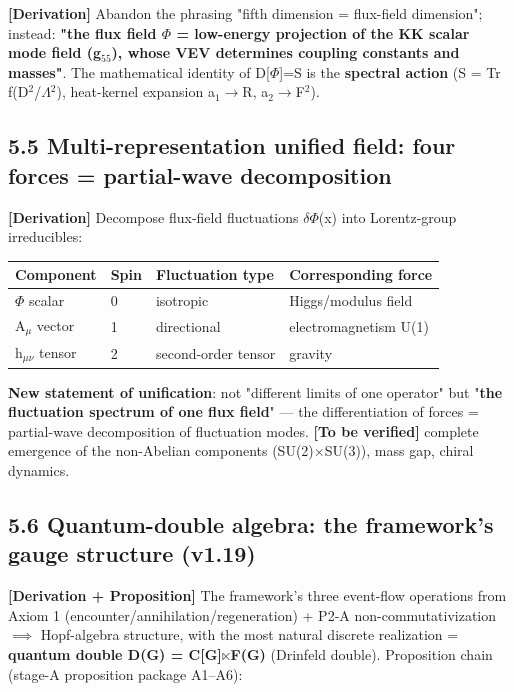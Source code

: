 \documentclass[12pt]{article}
\newcommand{\mtag}[1]{\textbf{[#1]}}
\newcommand{\up}[1]{\ensuremath{^{#1}}}
\newcommand{\down}[1]{\ensuremath{_{#1}}}
\begin{document}
\mtag{Derivation} Abandon the phrasing "fifth dimension = flux-field dimension"; instead: \textbf{"the flux field \ensuremath{\Phi} = low-energy projection of the KK scalar mode field (g\down{55}), whose VEV determines coupling constants and masses"}. The mathematical identity of D[\ensuremath{\Phi}]=S is the \textbf{spectral action} (S = Tr f(D\up{2}/\ensuremath{\Lambda}\up{2}), heat-kernel expansion a\down{1}\ensuremath{\to}R, a\down{2}\ensuremath{\to}F\up{2}).

\subsection{5.5 Multi-representation unified field: four forces = partial-wave decomposition}

\mtag{Derivation} Decompose flux-field fluctuations \ensuremath{\delta}\ensuremath{\Phi}(x) into Lorentz-group irreducibles:

\begin{table}[htbp]
\centering
\small
\begin{tabularx}{\textwidth}{@{}lXXX@{}}
\toprule
Component & Spin & Fluctuation type & Corresponding force \\
\midrule
\ensuremath{\Phi} scalar & 0 & isotropic & Higgs/modulus field \\
A\down{\mu{}} vector & 1 & directional & electromagnetism U(1) \\
h\down{\mu{}\nu{}} tensor & 2 & second-order tensor & gravity \\
\bottomrule
\end{tabularx}
\end{table}

\textbf{New statement of unification}: not "different limits of one operator" but "\textbf{the fluctuation spectrum of one flux field}" --- the differentiation of forces = partial-wave decomposition of fluctuation modes. \mtag{To be verified} complete emergence of the non-Abelian components (SU(2)\ensuremath{\times}SU(3)), mass gap, chiral dynamics.

\subsection{5.6 Quantum-double algebra: the framework's gauge structure (v1.19)}

\mtag{Derivation + Proposition} The framework's three event-flow operations from Axiom 1 (encounter/annihilation/regeneration) + P2-A non-commutativization \ensuremath{\implies} Hopf-algebra structure, with the most natural discrete realization = \textbf{quantum double D(G) = C[G]\ensuremath{\ltimes}F(G)} (Drinfeld double). Proposition chain (stage-A proposition package A1--A6):
\end{document}
